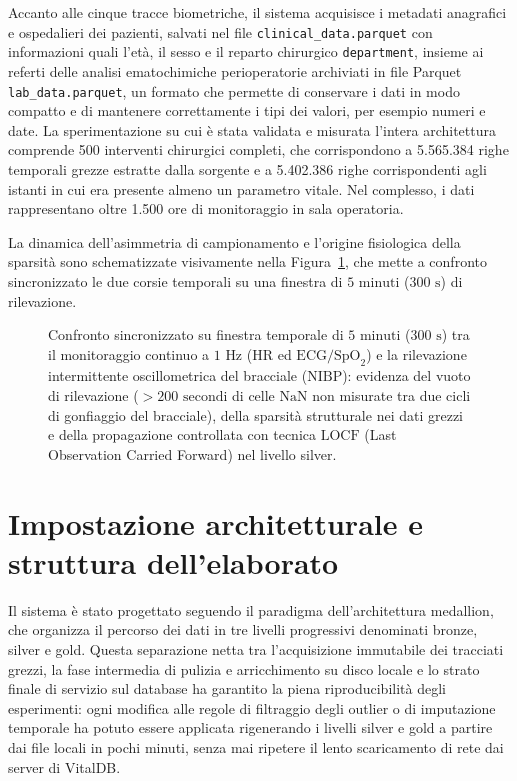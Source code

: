Accanto alle cinque tracce biometriche, il sistema acquisisce i metadati anagrafici e ospedalieri dei pazienti, salvati nel file \texttt{clinical\_data.parquet} con informazioni quali l'et\`a, il sesso e il reparto chirurgico \texttt{department}, insieme ai referti delle analisi ematochimiche perioperatorie archiviati in file Parquet \texttt{lab\_data.parquet}, un formato che permette di conservare i dati in modo compatto e di mantenere correttamente i tipi dei valori, per esempio numeri e date. La sperimentazione su cui \`e stata validata e misurata l'intera architettura comprende 500 interventi chirurgici completi, che corrispondono a 5.565.384 righe temporali grezze estratte dalla sorgente e a 5.402.386 righe corrispondenti agli istanti in cui era presente almeno un parametro vitale. Nel complesso, i dati rappresentano oltre 1.500 ore di monitoraggio in sala operatoria.

La dinamica dell'asimmetria di campionamento e l'origine fisiologica della sparsit\`a sono schematizzate visivamente nella Figura~\ref{fig:sampling_asymmetry}, che mette a confronto sincronizzato le due corsie temporali su una finestra di $5\text{ minuti}$ ($300\text{ s}$) di rilevazione.

\begin{figure}[!htbp]
    \centering
    \resizebox{\textwidth}{!}{}
    \caption{Confronto sincronizzato su finestra temporale di $5\text{ minuti}$ ($300\text{ s}$) tra il monitoraggio continuo a $1\text{ Hz}$ ($\text{HR}$ ed $\text{ECG/SpO}_2$) e la rilevazione intermittente oscillometrica del bracciale ($\text{NIBP}$): evidenza del vuoto di rilevazione ($>200\text{ secondi}$ di celle $\text{NaN}$ non misurate tra due cicli di gonfiaggio del bracciale), della sparsit\`a strutturale nei dati grezzi e della propagazione controllata con tecnica $\text{LOCF}$ (Last Observation Carried Forward) nel livello silver.}
    \label{fig:sampling_asymmetry}
\end{figure}
\FloatBarrier

\section{Impostazione architetturale e struttura dell'elaborato}
Il sistema \`e stato progettato seguendo il paradigma dell'architettura medallion, che organizza il percorso dei dati in tre livelli progressivi denominati bronze, silver e gold. Questa separazione netta tra l'acquisizione immutabile dei tracciati grezzi, la fase intermedia di pulizia e arricchimento su disco locale e lo strato finale di servizio sul database ha garantito la piena riproducibilit\`a degli esperimenti: ogni modifica alle regole di filtraggio degli outlier o di imputazione temporale ha potuto essere applicata rigenerando i livelli silver e gold a partire dai file locali in pochi minuti, senza mai ripetere il lento scaricamento di rete dai server di VitalDB.

